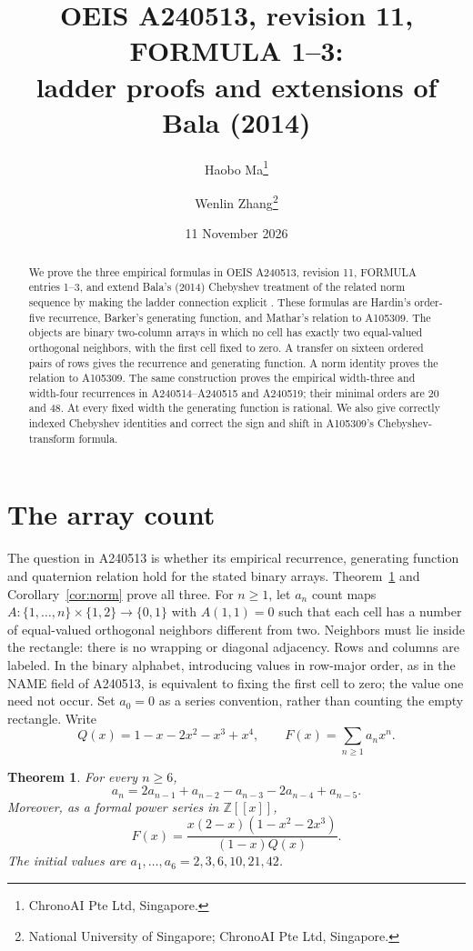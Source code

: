 \documentclass[11pt]{article}
\title{OEIS A240513, revision 11, FORMULA 1--3:\\
ladder proofs and extensions of Bala (2014)}
\author{Haobo Ma\thanks{ChronoAI Pte Ltd, Singapore.}\and
Wenlin Zhang\thanks{National University of Singapore; ChronoAI Pte Ltd, Singapore.}}
\date{11 November 2026}
\newtheorem{theorem}{Theorem}
\newcommand{\Z}{\mathbb{Z}}
\begin{document}
\maketitle
\begin{abstract}
We prove the three empirical formulas in OEIS A240513, revision 11,
FORMULA entries 1--3, and extend Bala's (2014) Chebyshev treatment of
the related norm sequence by making the ladder connection explicit
\cite{ladder,bala}. These formulas are Hardin's order-five recurrence,
Barker's generating function, and Mathar's relation to A105309.
The objects are binary two-column arrays in which no cell
has exactly two equal-valued orthogonal neighbors, with the first cell
fixed to zero. A transfer on sixteen ordered pairs of rows gives the
recurrence and generating function. A norm identity proves the relation
to A105309. The same construction proves the empirical width-three
and width-four recurrences in A240514--A240515 and A240519; their
minimal orders are 20 and 48. At every fixed width the generating
function is rational. We also give correctly indexed Chebyshev
identities and correct the sign and shift in A105309's
Chebyshev-transform formula.
\end{abstract}

\section{The array count}
The question in A240513 is whether its empirical recurrence, generating
function and quaternion relation hold for the stated binary arrays.
Theorem~\ref{thm:main} and Corollary~\ref{cor:norm} prove all three.
For $n\geq1$, let $a_n$ count maps
$A:\{1,\ldots,n\}\times\{1,2\}\longrightarrow\{0,1\}$ with $A(1,1)=0$
such that each cell has a number of equal-valued orthogonal neighbors
different from two. Neighbors must lie inside the rectangle: there is no
wrapping or diagonal adjacency. Rows and columns are labeled. In the
binary alphabet, introducing values in row-major order, as in the NAME
field of A240513, is equivalent to fixing the first cell to zero;
the value one need not occur. Set $a_0=0$ as a series convention, rather
than counting the empty rectangle. Write
\[
 Q(x)=1-x-2x^2-x^3+x^4,\qquad F(x)=\sum_{n\geq1}a_nx^n.
\]

\begin{theorem}\label{thm:main}
For every $n\geq6$,
\begin{equation}\label{eq:rec}
 a_n=2a_{n-1}+a_{n-2}-a_{n-3}-2a_{n-4}+a_{n-5}.
\end{equation}
Moreover, as a formal power series in $\Z[[x]]$,
\begin{equation}\label{eq:gf}
 F(x)=\frac{x(2-x)(1-x^2-2x^3)}{(1-x)Q(x)}.
\end{equation}
The initial values are $a_1,\ldots,a_6=2,3,6,10,21,42$.
\end{theorem}
\end{document}
